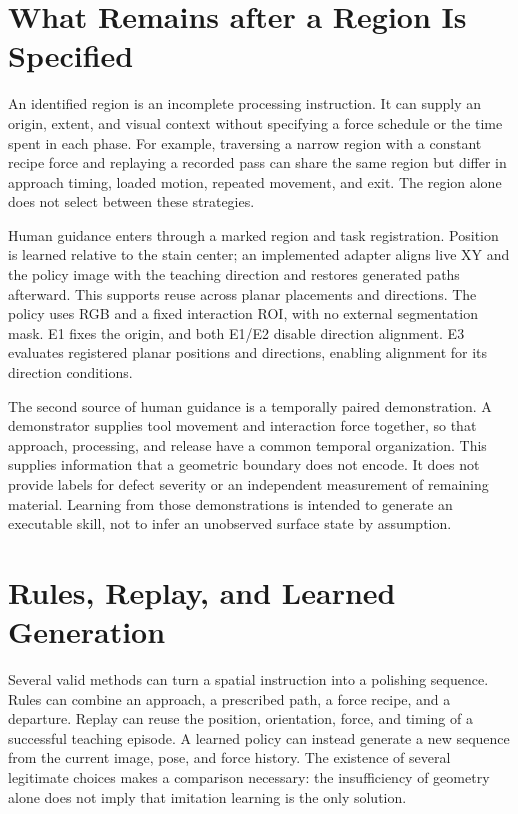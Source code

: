 \section{What Remains after a Region Is Specified}
An identified region is an incomplete processing instruction. It can supply an origin, extent, and visual context without specifying a force schedule or the time spent in each phase. For example, traversing a narrow region with a constant recipe force and replaying a recorded pass can share the same region but differ in approach timing, loaded motion, repeated movement, and exit. The region alone does not select between these strategies.

Human guidance enters through a marked region and task registration. Position is learned relative to the stain center; an implemented adapter aligns live XY and the policy image with the teaching direction and restores generated paths afterward. This supports reuse across planar placements and directions. The policy uses RGB and a fixed interaction ROI, with no external segmentation mask. E1 fixes the origin, and both E1/E2 disable direction alignment. E3 evaluates registered planar positions and directions, enabling alignment for its direction conditions.

The second source of human guidance is a temporally paired demonstration. A demonstrator supplies tool movement and interaction force together, so that approach, processing, and release have a common temporal organization. This supplies information that a geometric boundary does not encode. It does not provide labels for defect severity or an independent measurement of remaining material. Learning from those demonstrations is intended to generate an executable skill, not to infer an unobserved surface state by assumption.

\section{Rules, Replay, and Learned Generation}
Several valid methods can turn a spatial instruction into a polishing sequence. Rules can combine an approach, a prescribed path, a force recipe, and a departure. Replay can reuse the position, orientation, force, and timing of a successful teaching episode. A learned policy can instead generate a new sequence from the current image, pose, and force history. The existence of several legitimate choices makes a comparison necessary: the insufficiency of geometry alone does not imply that imitation learning is the only solution.

